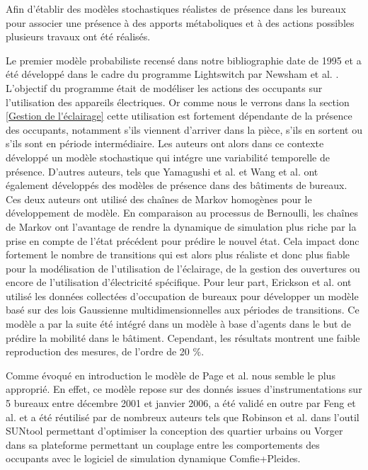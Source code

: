Afin d'établir des modèles stochastiques réalistes de présence dans les bureaux pour associer une présence à des apports métaboliques et à des actions possibles plusieurs travaux ont été réalisés.

Le premier modèle probabiliste recensé dans notre bibliographie date de 1995 et a été développé dans le cadre du programme Lightswitch par Newsham et al. \cite{Newsham-95}. L'objectif du programme était de modéliser les actions des occupants sur l'utilisation des appareils électriques. Or comme nous le verrons dans la section \ref {Gestion de l'éclairage} cette utilisation est fortement dépendante de la présence des occupants, notamment s'ils viennent d'arriver dans la pièce, s'ils en sortent ou s'ils sont en période intermédiaire. Les auteurs ont alors dans ce contexte développé un modèle stochastique qui intégre une variabilité temporelle de présence. D'autres auteurs, tels que Yamagushi et al. \cite{Yamaguchi-03} et Wang et al. \cite{Wang-05} ont également développés des modèles de présence dans des bâtiments de bureaux. Ces deux auteurs ont utilisé des chaînes de Markov homogènes pour le développement de modèle. En comparaison au processus de Bernoulli, les chaînes de Markov ont l'avantage de rendre la dynamique de simulation plus riche par la prise en compte de l'état précédent pour prédire le nouvel état. Cela impact donc fortement le nombre de transitions qui est alors plus réaliste et donc plus fiable pour la modélisation de l'utilisation de l'éclairage, de la gestion des ouvertures ou encore de l'utilisation d'électricité spécifique. Pour leur part, Erickson et al. \cite{Erickson-09} ont utilisé les données collectées d'occupation de bureaux pour développer un modèle basé sur des lois Gaussienne multidimensionnelles aux périodes de transitions. Ce modèle a par la suite été intégré dans un modèle à base d'agents dans le but de prédire la mobilité dans le bâtiment. Cependant, les résultats montrent une faible reproduction des mesures, de l'ordre de 20 \%.

Comme évoqué en introduction le modèle de Page et al. \cite{Page-08} nous semble le plus approprié. En effet, ce modèle repose sur des donnés issues d'instrumentations sur 5 bureaux entre décembre 2001 et janvier 2006, a été validé en outre par Feng et al. \cite{Feng-15} et a été réutilisé par de nombreux auteurs tels que Robinson et al. \cite{Robinson-07} dans l'outil SUNtool permettant d'optimiser la conception des quartier urbains ou Vorger \cite{Vorger-14} dans sa plateforme permettant un couplage entre les comportements des occupants avec le logiciel de simulation dynamique Comfie+Pleides.

